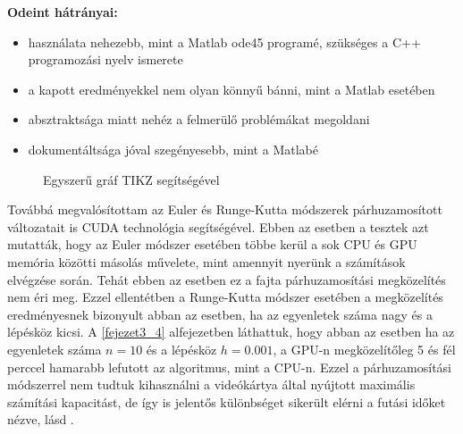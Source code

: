 \textbf{Odeint hátrányai:}
\begin{itemize}
	\item használata nehezebb, mint a Matlab ode45 programé, szükséges a C++ programozási nyelv ismerete
	\item a kapott eredményekkel nem olyan könnyű bánni, mint a Matlab esetében
	\item absztraktsága miatt nehéz a felmerülő problémákat megoldani
	\item dokumentáltsága jóval szegényesebb, mint a Matlabé
\end{itemize}




\begin{figure}
	\centering
\caption{Egyszer\H u gr\'af TIKZ seg\'its\'eg\'evel}
\end{figure}




Továbbá megvalósítottam az Euler és Runge-Kutta módszerek párhuzamosított változatait is CUDA technológia segítségével. Ebben az esetben a tesztek azt mutatták, hogy az Euler módszer esetében többe kerül a sok CPU és GPU memória közötti másolás művelete, mint amennyit nyerünk a számítások elvégzése során. Tehát ebben az esetben ez a fajta párhuzamosítási megközelítés nem éri meg. Ezzel ellentétben a Runge-Kutta módszer esetében a megközelítés eredményesnek bizonyult abban az esetben, ha az egyenletek száma nagy és a lépésköz kicsi. A \ref{fejezet3_4} alfejezetben láthattuk, hogy abban az esetben ha az egyenletek száma $ n = 10 $ és a lépésköz $ h = 0.001 $, a GPU-n megközelítőleg 5 és fél perccel hamarabb lefutott az algoritmus, mint a CPU-n. Ezzel a párhuzamosítási módszerrel nem tudtuk kihasználni a videókártya által nyújtott maximális számítási kapacitást, de így is jelentős különbséget sikerült elérni a futási időket nézve, l\'asd \cite{Katai}.


